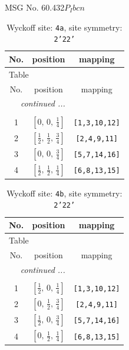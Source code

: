 \documentclass[fleqn,8pt]{jsarticle}
\begin{document}
\setcounter{MaxMatrixCols}{32}

\renewcommand{\tablename}{Table~}
\renewcommand{\figurename}{Figure~}
\begin{center}
\LARGE
MSG No. 60.432\quad$P_{I}bcn$
\end{center}
\renewcommand{\arraystretch}{1.2}
\begin{longtable}{ccc}
\caption{Wyckoff site: {\tt 4a}, site symmetry: {\tt 2'22'}}
 \\
 \hline \hline
No. & position & mapping \\ \hline \endfirsthead

\multicolumn{2}{l}{\tablename\ \thetable{}} \\
 \hline \hline
No. & position & mapping \\ \hline \endhead

 \hline \hline
\multicolumn{2}{r}{\footnotesize\it continued ...} \\ \endfoot

 \hline \hline
\multicolumn{2}{r}{} \\ \endlastfoot

1 & $\left[ 0,\, 0,\, \frac{1}{4} \right]$ & {\tt [1,3,10,12]} \\ \hline
2 & $\left[ \frac{1}{2},\, \frac{1}{2},\, \frac{3}{4} \right]$ & {\tt [2,4,9,11]} \\ \hline
3 & $\left[ 0,\, 0,\, \frac{3}{4} \right]$ & {\tt [5,7,14,16]} \\ \hline
4 & $\left[ \frac{1}{2},\, \frac{1}{2},\, \frac{1}{4} \right]$ & {\tt [6,8,13,15]} \\
\end{longtable}
\renewcommand{\arraystretch}{1.2}
\begin{longtable}{ccc}
\caption{Wyckoff site: {\tt 4b}, site symmetry: {\tt 2'22'}}
 \\
 \hline \hline
No. & position & mapping \\ \hline \endfirsthead

\multicolumn{2}{l}{\tablename\ \thetable{}} \\
 \hline \hline
No. & position & mapping \\ \hline \endhead

 \hline \hline
\multicolumn{2}{r}{\footnotesize\it continued ...} \\ \endfoot

 \hline \hline
\multicolumn{2}{r}{} \\ \endlastfoot

1 & $\left[ \frac{1}{2},\, 0,\, \frac{1}{4} \right]$ & {\tt [1,3,10,12]} \\ \hline
2 & $\left[ 0,\, \frac{1}{2},\, \frac{3}{4} \right]$ & {\tt [2,4,9,11]} \\ \hline
3 & $\left[ \frac{1}{2},\, 0,\, \frac{3}{4} \right]$ & {\tt [5,7,14,16]} \\ \hline
4 & $\left[ 0,\, \frac{1}{2},\, \frac{1}{4} \right]$ & {\tt [6,8,13,15]} \\
\end{longtable}
\end{document}
